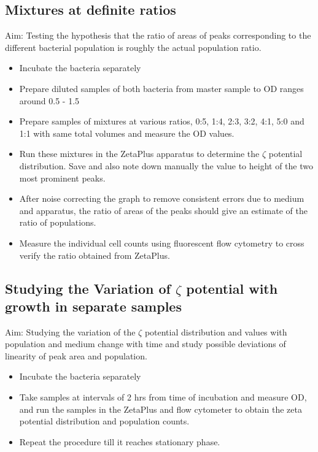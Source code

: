 \documentclass [a4paper,11pt]{article}
\begin{document}
\subsection{Mixtures at definite ratios}
Aim: Testing the hypothesis that the ratio of areas of peaks corresponding to the different bacterial population is roughly the actual population ratio.
\begin{itemize}
	\item Incubate the bacteria separately
	\item Prepare diluted samples of both bacteria from master sample to OD ranges around 0.5 - 1.5
	\item Prepare samples of mixtures at various ratios, 0:5, 1:4, 2:3, 3:2, 4:1, 5:0 and 1:1 with same total volumes and measure the OD values.
	\item Run these mixtures in the ZetaPlus apparatus to determine the $\zeta$ potential distribution. Save and also note down manually the value to height of the two most prominent peaks. 
	\item After noise correcting the graph to remove consistent errors due to medium and apparatus, the ratio of areas of the peaks should give an estimate of the ratio of populations.
	\item Measure the individual cell counts using fluorescent flow cytometry to cross verify the ratio obtained from ZetaPlus.
\end{itemize}
\subsection{Studying the Variation of $\zeta$ potential with growth in separate samples}
Aim: Studying the variation of the $\zeta$ potential distribution and values with population and medium change with time and study possible deviations of linearity of peak area and population.
\begin{itemize}
	\item Incubate the bacteria separately
	\item Take samples at intervals of 2 hrs from time of incubation and measure OD, and run the samples in the ZetaPlus and flow cytometer to obtain the zeta potential distribution and population counts.
	\item Repeat the procedure till it reaches stationary phase.
\end{itemize}
\end{document}
